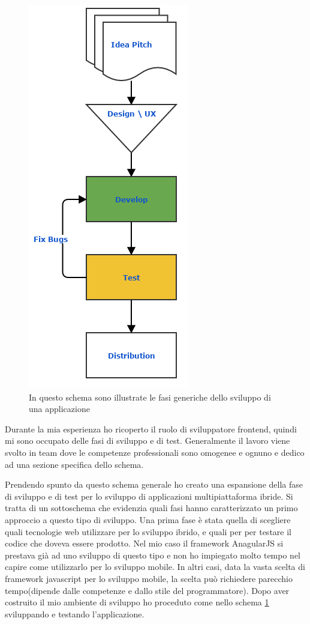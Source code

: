 \begin{figure}
	\begin{center}
		\includegraphics[scale=0.5]{Figures/classic_app_flow.png}
		\caption[Schema generale]{In questo schema sono illustrate le fasi generiche dello sviluppo di una applicazione}
		\label{fig:classic_app_flow}
	\end{center}
\end{figure}

Durante la mia esperienza ho ricoperto il ruolo di sviluppatore frontend, quindi mi sono occupato delle fasi di sviluppo e di test. Generalmente il lavoro viene svolto in team dove le competenze professionali sono omogenee e ognuno e dedico ad una sezione specifica dello schema.

Prendendo spunto da questo schema generale ho creato una espansione della fase di sviluppo e di test per lo sviluppo di applicazioni multipiattaforma ibride. Si tratta di un sottoschema che evidenzia quali fasi hanno caratterizzato un primo approccio a questo tipo di sviluppo.
Una prima fase è stata quella di scegliere quali tecnologie web utilizzare per lo sviluppo ibrido, e quali per per testare il codice che doveva essere prodotto. Nel mio caso il framework AnagularJS si prestava già ad uno sviluppo di questo tipo e non ho impiegato molto tempo nel capire come utilizzarlo per lo sviluppo mobile. In altri casi, data la vasta scelta di framework javascript per lo sviluppo mobile, la scelta può richiedere parecchio tempo(dipende dalle competenze e dallo stile del programmatore).
Dopo aver costruito il mio ambiente di sviluppo ho proceduto come nello schema \ref{fig:classic_app_flow} sviluppando e testando l'applicazione.


